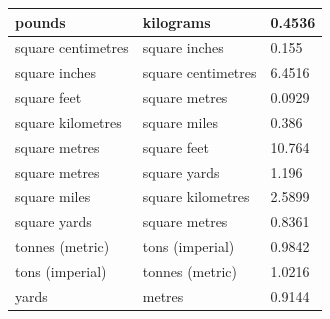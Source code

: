 \documentclass[10pt]{article}
\begin{document}
\begin{center}
\begin{tabular}{|l|l|l|}
pounds & kilograms & 0.4536 \\
\hline
square centimetres & square inches & 0.155 \\
\hline
square inches & square centimetres & 6.4516 \\
\hline
square feet & square metres & 0.0929 \\
\hline
square kilometres & square miles & 0.386 \\
\hline
square metres & square feet & 10.764 \\
\hline
square metres & square yards & 1.196 \\
\hline
square miles & square kilometres & 2.5899 \\
\hline
square yards & square metres & 0.8361 \\
\hline
tonnes (metric) & tons (imperial) & 0.9842 \\
\hline
tons (imperial) & tonnes (metric) & 1.0216 \\
\hline
yards & metres & 0.9144 \\
\hline
\end{tabular}
\end{center}
\end{document}
